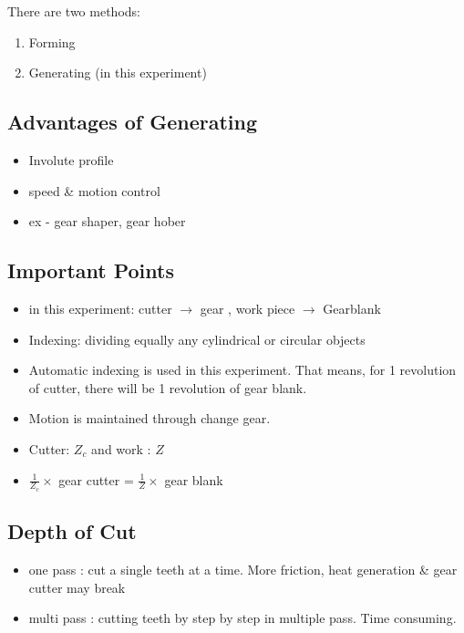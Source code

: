 \documentclass{article}
\begin{document}
\begin{multicols}{2}
  There are two methods: \\
  \begin{enumerate}
    \item Forming
    \item Generating (in this experiment)
  \end{enumerate}
  \subsection{Advantages of Generating}
  \begin{itemize}
    \item Involute profile 
    \item speed \& motion control 
    \item ex - gear shaper, gear hober 
  \end{itemize}
  \subsection{Important Points}
  \begin{itemize}
    \item in this experiment: cutter $\rightarrow$ gear , work piece $\rightarrow$ Gearblank 
    \item Indexing: dividing equally any cylindrical or circular objects 
    \item Automatic indexing is used in this experiment. That means, for 1 revolution of cutter, there will be 1 revolution of gear blank. 
    \item Motion is maintained through change gear. 
    \item Cutter: $Z_c$ and work : $Z$ 
    \item $\frac{1}{Z_c} \times$ gear cutter = $\frac{1}{Z} \times$ gear blank 
  \end{itemize}

  \subsection{Depth of Cut}
  \begin{itemize}
    \item one pass : cut a single teeth at a time. More friction, heat generation \& gear cutter may break 
    \item multi pass : cutting teeth by step by step in multiple pass. Time consuming. 
  \end{itemize}


\end{multicols}
\end{document}
